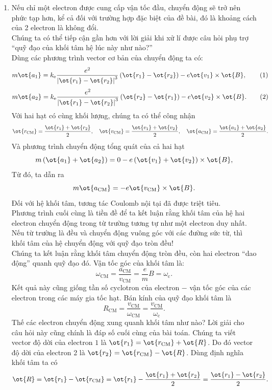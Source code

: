 \begin{loigiai}
\begin{enumerate}[1)]
      \item Nếu chỉ một electron được cung cấp vận tốc đầu, chuyển động sẽ trở nên phức tạp hơn, kể cả đối với trường hợp đặc biệt của đề bài, đó là khoảng cách của 2 electron là không đổi. \\
   Chúng ta có thể tiếp cận gần hơn với lời giải khi xử lí được câu hỏi phụ trợ ``quỹ đạo của khối tâm hệ lúc này như nào?'' \\
   Dùng các phương trình vector cơ bản của chuyển động ta có:
   \[m \ot{a_1} = k_{\mathrm{e}} \dfrac{e^{2}}{\left|\ot{r_1}- \ot{r_2}\right|^{3}}\left(\ot{r_1}-\ot{r_2}\right)-e \ot{v_1} \times \ot{B}, \tag{1}\label{N.5.1}\]
    \[m \ot{a_2} = k_{\mathrm{e}} \dfrac{e^{2}}{\left|\ot{r_1}-\ot{r_2}\right|^{3}}\left(\ot{r_2}-\ot{r_1}\right)-e \ot{v_2} \times \ot{B}. \tag{2}\label{N.5.2} \]
    Với hai hạt có cùng khối lượng, chúng ta có thể công nhận
    \[\ot{r_{\mathrm{CM}}}=\frac{\ot{r_1}+\ot{r_2}}{2}, \quad \ot{v_{\mathrm{CM}}}=\dfrac{\ot{v_1}+\ot{v_2}}{2}, \quad \ot{a_{\mathrm{CM}}}=\dfrac{\ot{a_1}+\ot{a_2}}{2}.\]
     Và phương trình chuyển động tổng quát của cả hai hạt
     \[m\left(\ot{a_1}+\ot{a_2}\right) = 0-e\left(\ot{v_1}+\ot{v_2}\right) \times \ot{B},\]
     Từ đó, ta dẫn ra 
     \[m \ot{a_\mathrm{CM}}=-e \ot{v_\mathrm{CM}} \times \ot{B}.\]
      Đối với hệ khối tâm, tương tác Coulomb nội tại đã được triệt tiêu.\\
    Phương trình cuối cùng là tiền đề để ta kết luận rằng khối tâm của hệ hai electron chuyển động trong từ trường tương tự như một electron duy nhất. Nếu từ trường là đều và chuyển động vuông góc với các đường sức từ, thì khối tâm của hệ chuyển động với quỹ đạo tròn đều!\\
    Chúng ta kết luận rằng khối tâm chuyển động tròn đều, còn hai electron ``dao động'' quanh quỹ đạo đó. Vận tốc góc của khối tâm là:
    \[\omega_{\mathrm{CM}}=\dfrac{a_{\mathrm{CM}}}{v_{\mathrm{CM}}}=\dfrac{e}{m} B=\omega_{\mathrm{c}}.\]
    Kết quả này cũng giống tần số cyclotron của electron $-$ vận tốc góc của các electron trong các máy gia tốc hạt. Bán kính của quỹ đạo khối tâm là
    \[R_{\mathrm{CM}}=\dfrac{v_{\mathrm{CM}}}{\omega_{\mathrm{CM}}}=\dfrac{v_{\mathrm{CM}}}{\omega_{\mathrm{c}}}.\]
    Thế các electron chuyển động xung quanh khối tâm như nào? Lời giải cho câu hỏi này cũng chính là đáp số cuối cùng của bài toán. Chúng ta viết vector độ dời của electron $1$ là $\ot{r_1} =\ot{r_\mathrm{CM}}+\ot{R}$. Do đó vector độ dời của electron 2 là $\ot{r_2} = \ot{r_\mathrm{CM}} - \ot{R}$. Dùng định nghĩa khối tâm ta có
    \[\ot{R}=\ot{r_1}-\ot{r_\mathrm{CM}}=\ot{r_1}-\dfrac{\ot{r_1}+\ot{r_2}}{2}=\dfrac{\ot{r_1}-\ot{r_2}}{2}.\]

\end{enumerate}
\end{loigiai}
